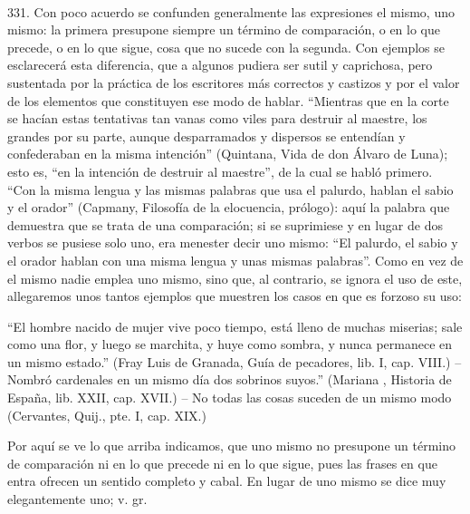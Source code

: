 \documentclass{article}
\begin{document}
\paragraph{} 331. Con poco acuerdo se confunden generalmente las expresiones el mismo, uno mismo: la primera 
presupone siempre un término de comparación, o en lo que precede, o en lo que sigue, cosa que no sucede con la 
segunda. Con ejemplos se esclarecerá esta diferencia, que a algunos pudiera ser sutil y caprichosa, pero 
sustentada por la práctica de los escritores más correctos y castizos y por el valor de los elementos que 
constituyen ese modo de hablar.
“Mientras que en la corte se hacían estas tentativas tan vanas como viles para destruir al maestre, los grandes 
por su parte, aunque desparramados y dispersos se entendían y confederaban en la misma intención” (Quintana, 
Vida de don Álvaro de Luna); esto es, “en la intención de destruir al maestre”, de la cual se habló primero.
“Con la misma lengua y las mismas palabras que usa el palurdo, hablan el sabio y el orador” (Capmany, Filosofía 
de la elocuencia, prólogo): aquí la palabra que demuestra que se trata de una comparación; si se suprimiese y en 
lugar de dos verbos se pusiese solo uno, era menester decir uno mismo: “El palurdo, el sabio y el orador hablan 
con una misma lengua y unas mismas palabras”.
Como en vez de el mismo nadie emplea uno mismo, sino que, al contrario, se ignora el uso de este, allegaremos 
unos tantos ejemplos que muestren los casos en que es forzoso su uso:

“El hombre nacido de mujer vive poco tiempo, está lleno de muchas miserias; sale como una flor, y luego se 
marchita, y huye como sombra, y nunca permanece en un mismo estado.” (Fray Luis de Granada, Guía de pecadores, 
lib. I, cap. VIII.) – Nombró cardenales en un mismo día dos sobrinos suyos.” (Mariana , Historia de España, lib. 
XXII, cap. XVII.) – No todas las cosas suceden de un mismo modo (Cervantes, Quij., pte. I, cap. XIX.)

Por aquí se ve lo que arriba indicamos, que uno mismo no presupone un término de comparación ni en lo que 
precede ni en lo que sigue, pues las frases en que entra ofrecen un sentido completo y cabal.
En lugar de uno mismo se dice muy elegantemente uno; v. gr.
\end{document}
